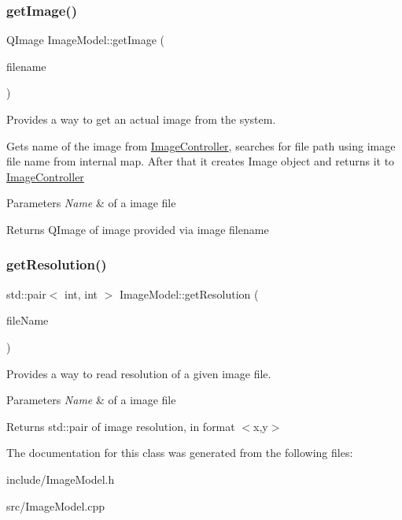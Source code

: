 \subsubsection{\texorpdfstring{get\+Image()}{getImage()}}
{\footnotesize\ttfamily Q\+Image Image\+Model\+::get\+Image (\begin{DoxyParamCaption}\item[{const Q\+String \&}]{filename }\end{DoxyParamCaption})}



Provides a way to get an actual image from the system. 

Gets name of the image from \hyperlink{classImageController}{Image\+Controller}, searches for file path using image file name from internal map. After that it creates Image object and returns it to \hyperlink{classImageController}{Image\+Controller}


\begin{DoxyParams}{Parameters}
{\em Name} & of a image file\\
\hline
\end{DoxyParams}
\begin{DoxyReturn}{Returns}
Q\+Image of image provided via image filename 
\end{DoxyReturn}
\mbox{\label{classImageModel_af44b02e6974b36d2ede3b1b3f78ebc84}} 
\subsubsection{\texorpdfstring{get\+Resolution()}{getResolution()}}
{\footnotesize\ttfamily std\+::pair$<$ int, int $>$ Image\+Model\+::get\+Resolution (\begin{DoxyParamCaption}\item[{const Q\+String \&}]{file\+Name }\end{DoxyParamCaption})}



Provides a way to read resolution of a given image file. 


\begin{DoxyParams}{Parameters}
{\em Name} & of a image file\\
\hline
\end{DoxyParams}
\begin{DoxyReturn}{Returns}
std\+::pair of image resolution, in format $<$x,y$>$ 
\end{DoxyReturn}


The documentation for this class was generated from the following files\+:\begin{DoxyCompactItemize}
\item 
include/Image\+Model.\+h\item 
src/Image\+Model.\+cpp\end{DoxyCompactItemize}
